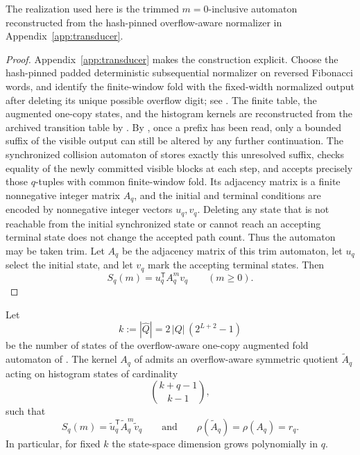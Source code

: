 \begin{remark}
The realization used here is the trimmed \(m=0\)-inclusive automaton
reconstructed from the hash-pinned overflow-aware normalizer in
Appendix~\ref{app:transducer}.
\end{remark}

\begin{proof}
Appendix~\ref{app:transducer} makes the construction explicit.  Choose the
hash-pinned padded deterministic subsequential normalizer on reversed Fibonacci
words, and identify the finite-window fold with the fixed-width normalized
output after deleting its unique possible overflow digit; see
.  The
finite table, the augmented one-copy states, and the histogram kernels are
reconstructed from the archived transition table by
.  By
, once a prefix has been read, only a
bounded suffix of the visible output can still be altered by any further
continuation.  The synchronized collision automaton of
 stores exactly this unresolved suffix,
checks equality of the newly committed visible blocks at each step, and accepts
precisely those \(q\)-tuples with common finite-window fold.  Its adjacency
matrix is a finite nonnegative integer matrix \(A_q\), and the initial and
terminal conditions are encoded by nonnegative integer vectors \(u_q,v_q\).
Deleting any state that is not reachable from the initial synchronized state or
cannot reach an accepting terminal state does not change the accepted path
count.  Thus the automaton may be taken trim.  Let \(A_q\) be the adjacency
matrix of this trim automaton, let \(u_q\) select the initial state, and let
\(v_q\) mark the accepting terminal states.  Then
\[
  S_q(m)=u_q^{\mathsf T}A_q^m v_q
  \qquad (m\ge 0).
\]
\end{proof}

\begin{theorem}
\label{thm:symmetric-compression}
Let
\[
  k:=|\widehat Q|=2\,|Q|\,(2^{L+2}-1)
\]
be the number of states of the overflow-aware one-copy augmented fold automaton
of .  The kernel \(A_q\) of
 admits an overflow-aware symmetric quotient
\(\widetilde A_q\) acting on histogram states of cardinality
\[
  \binom{k+q-1}{k-1},
\]
such that
\[
  S_q(m)=\widetilde u_q^{\mathsf T}\widetilde A_q^m\widetilde v_q
  \qquad\text{and}\qquad
  \rho(\widetilde A_q)=\rho(A_q)=r_q.
\]
In particular, for fixed \(k\) the state-space dimension grows polynomially in
\(q\).
\end{theorem}

